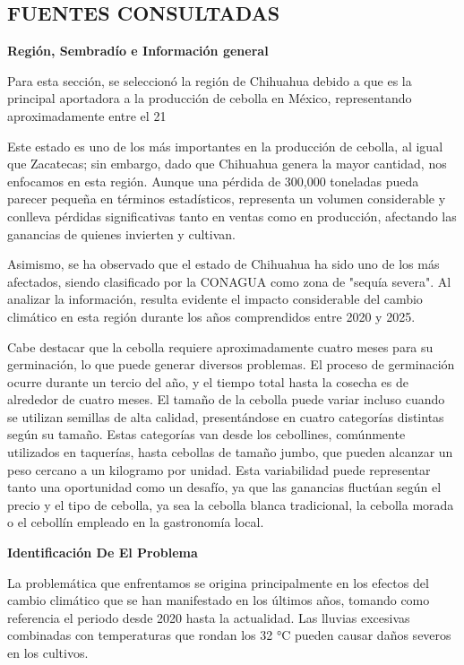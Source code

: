 \documentclass[12pt]{article}
\begin{document}
\subsection{FUENTES CONSULTADAS}
\newpage
\begin{center}
	{\huge \textbf{Región, Sembradío e Información general} }
\end{center}
\vspace{1cm} 
{\large %
Para esta sección, se seleccionó la región de Chihuahua debido a que es la principal aportadora a la producción de cebolla en México, representando aproximadamente entre el 21 %

Este estado es uno de los más importantes en la producción de cebolla, al igual que Zacatecas; sin embargo, dado que Chihuahua genera la mayor cantidad, nos enfocamos en esta región. Aunque una pérdida de 300,000 toneladas pueda parecer pequeña en términos estadísticos, representa un volumen considerable y conlleva pérdidas significativas tanto en ventas como en producción, afectando las ganancias de quienes invierten y cultivan.

Asimismo, se ha observado que el estado de Chihuahua ha sido uno de los más afectados, siendo clasificado por la CONAGUA como zona de "sequía severa". Al analizar la información, resulta evidente el impacto considerable del cambio climático en esta región durante los años comprendidos entre 2020 y 2025.

Cabe destacar que la cebolla requiere aproximadamente cuatro meses para su germinación, lo que puede generar diversos problemas. El proceso de germinación ocurre durante un tercio del año, y el tiempo total hasta la cosecha es de alrededor de cuatro meses. El tamaño de la cebolla puede variar incluso cuando se utilizan semillas de alta calidad, presentándose en cuatro categorías distintas según su tamaño. Estas categorías van desde los cebollines, comúnmente utilizados en taquerías, hasta cebollas de tamaño jumbo, que pueden alcanzar un peso cercano a un kilogramo por unidad. Esta variabilidad puede representar tanto una oportunidad como un desafío, ya que las ganancias fluctúan según el precio y el tipo de cebolla, ya sea la cebolla blanca tradicional, la cebolla morada o el cebollín empleado en la gastronomía local.
\newpage
\begin{center}
	{\huge \textbf{Identificación  De El Problema}}
\end{center}
\vspace{1cm} 
{\large %
La problemática que enfrentamos se origina principalmente en los efectos del cambio climático que se han manifestado en los últimos años, tomando como referencia el periodo desde 2020 hasta la actualidad. Las lluvias excesivas combinadas con temperaturas que rondan los 32 °C pueden causar daños severos en los cultivos.

}}
\end{document}
